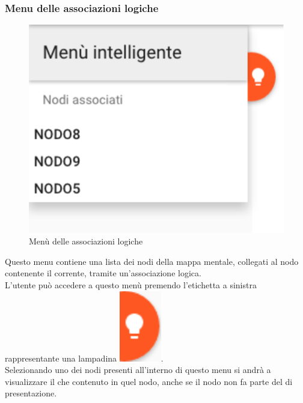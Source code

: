 \subsubsection{Menu delle associazioni logiche}
\begin{figure}[H]
\centering
\includegraphics[scale=0.5]{immagini/menuLogico.pdf}
\caption{Menù delle associazioni logiche}
\end{figure}
Questo menu contiene una lista dei nodi della mappa mentale, collegati al nodo contenente il  corrente, tramite un'associazione logica.\\
L'utente può accedere a questo menù premendo l'etichetta a sinistra rappresentante una lampadina \includegraphics[scale=0.5]{immagini/lampadina.pdf}.\\
Selezionando uno dei nodi presenti all'interno di questo menu si andrà a visualizzare il  che contenuto in quel nodo, anche se il nodo non fa parte del  di presentazione.
